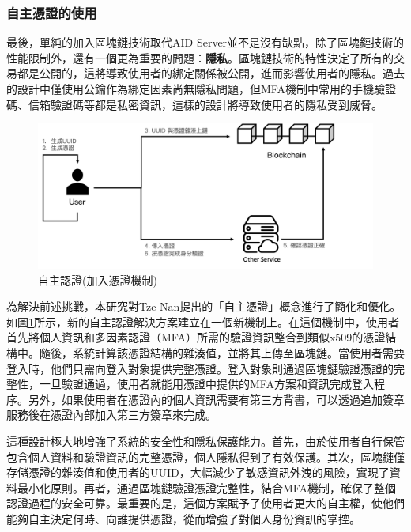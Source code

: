 \subsubsection{自主憑證的使用}
最後，單純的加入區塊鏈技術取代AID Server並不是沒有缺點，除了區塊鏈技術的性能限制外，還有一個更為重要的問題：\textbf{隱私}。區塊鏈技術的特性決定了所有的交易都是公開的，這將導致使用者的綁定關係被公開，進而影響使用者的隱私。過去的設計中僅使用公鑰作為綁定因素尚無隱私問題，但MFA機制中常用的手機驗證碼、信箱驗證碼等都是私密資訊，這樣的設計將導致使用者的隱私受到威脅。

\begin{figure}
  \centering
  \includegraphics[width=\linewidth]{figures/new-aid-login.png}
  \caption{自主認證(加入憑證機制)}
  \label{fig:new-aid-login}
\end{figure}
為解決前述挑戰，本研究對Tze-Nan\cite{NTU202102846}提出的「自主憑證」概念進行了簡化和優化。如圖\ref{fig:new-aid-login}所示，新的自主認證解決方案建立在一個新機制上。在這個機制中，使用者首先將個人資訊和多因素認證（MFA）所需的驗證資訊整合到類似x509的憑證結構中。隨後，系統計算該憑證結構的雜湊值，並將其上傳至區塊鏈。當使用者需要登入時，他們只需向登入對象提供完整憑證。登入對象則通過區塊鏈驗證憑證的完整性，一旦驗證通過，使用者就能用憑證中提供的MFA方案和資訊完成登入程序。另外，如果使用者在憑證內的個人資訊需要有第三方背書，可以透過追加簽章服務後在憑證內部加入第三方簽章來完成。

這種設計極大地增強了系統的安全性和隱私保護能力。首先，由於使用者自行保管包含個人資料和驗證資訊的完整憑證，個人隱私得到了有效保護。其次，區塊鏈僅存儲憑證的雜湊值和使用者的UUID，大幅減少了敏感資訊外洩的風險，實現了資料最小化原則。再者，通過區塊鏈驗證憑證完整性，結合MFA機制，確保了整個認證過程的安全可靠。最重要的是，這個方案賦予了使用者更大的自主權，使他們能夠自主決定何時、向誰提供憑證，從而增強了對個人身份資訊的掌控。
